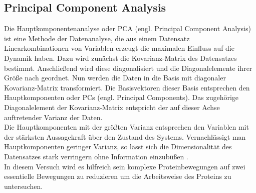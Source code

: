 
\subsection{Principal Component Analysis}
Die Hauptkomponentenanalyse oder PCA (engl. Principal Component Analysis) ist eine Methode der Datenanalyse, die aus einem Datensatz Linearkombinationen von Variablen erzeugt die maximalen Einfluss auf die Dynamik haben.
Dazu wird zunächst die Kovarianz-Matrix des Datensatzes bestimmt. Anschließend wird diese diagonalisiert und die Diagonalelemente ihrer Größe nach geordnet. Nun werden die Daten in die Basis mit diagonaler Kovarianz-Matrix transformiert.
Die Basisvektoren dieser Basis entsprechen den Hauptkomponenten oder PCs (engl. Principal Components).
Das zugehörige Diagonalelement der Kovarianz-Matrix entspricht der auf dieser Achse auftretender Varianz der Daten.
\\ \noindent
Die Hauptkomponenten mit der größten Varianz entsprechen den Variablen mit der stärksten Aussagekraft über den Zustand des Systems. Vernachlässigt man Hauptkomponenten geringer Varianz, so lässt sich die Dimensionalität des Datensatzes stark verringern ohne Information einzubüßen \cite{bishop2006pattern}.\\
In diesem Versuch wird es hilfreich sein komplexe Proteinbewegungen auf zwei essentielle Bewegungen zu reduzieren um die Arbeitsweise des Proteins zu untersuchen.

